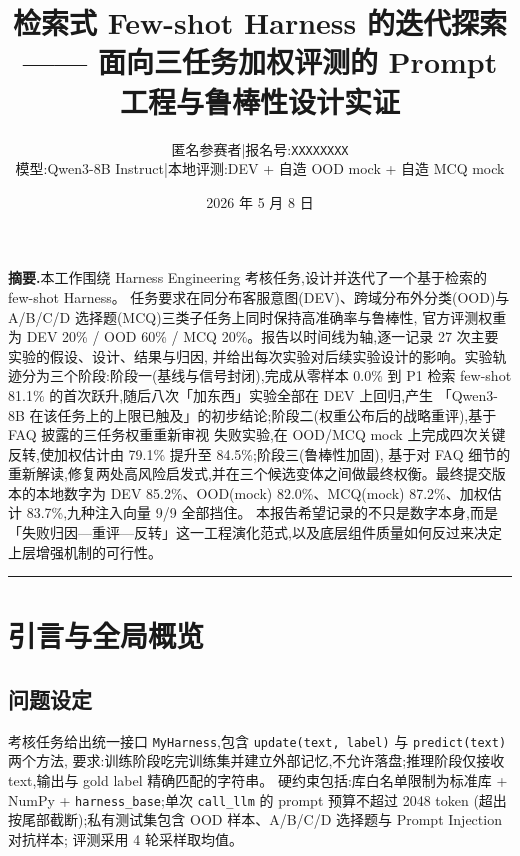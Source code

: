 \documentclass[11pt,a4paper]{ctexart}
\title{\vspace{-1.2cm}\textbf{检索式 Few-shot Harness 的迭代探索}\\[0.3em]
  \large{—— 面向三任务加权评测的 Prompt 工程与鲁棒性设计实证}}
\author{\normalsize 匿名参赛者\quad|\quad 报名号:\texttt{XXXXXXXX} \\[0.4em]
  \small 模型:Qwen3-8B Instruct\quad|\quad 本地评测:DEV + 自造 OOD mock + 自造 MCQ mock}
\date{\small 2026 年 5 月 8 日}
\begin{document}
\maketitle
\thispagestyle{fancy}

\begin{center}
\begin{minipage}{0.92\textwidth}
\textbf{摘要.}\;本工作围绕 Harness Engineering 考核任务,设计并迭代了一个基于检索的 few-shot Harness。
任务要求在同分布客服意图(DEV)、跨域分布外分类(OOD)与 A/B/C/D 选择题(MCQ)三类子任务上同时保持高准确率与鲁棒性,
官方评测权重为 DEV 20\% / OOD 60\% / MCQ 20\%。报告以时间线为轴,逐一记录 27 次主要实验的假设、设计、结果与归因,
并给出每次实验对后续实验设计的影响。实验轨迹分为三个阶段:阶段一(基线与信号封闭),完成从零样本
0.0\% 到 P1 检索 few-shot 81.1\% 的首次跃升,随后八次「加东西」实验全部在 DEV 上回归,产生
「Qwen3-8B 在该任务上的上限已触及」的初步结论;阶段二(权重公布后的战略重评),基于 FAQ 披露的三任务权重重新审视
失败实验,在 OOD/MCQ mock 上完成四次关键反转,使加权估计由 79.1\% 提升至 84.5\%;阶段三(鲁棒性加固),
基于对 FAQ 细节的重新解读,修复两处高风险启发式,并在三个候选变体之间做最终权衡。最终提交版本的本地数字为
DEV 85.2\%、OOD(mock) 82.0\%、MCQ(mock) 87.2\%、加权估计 83.7\%,九种注入向量 9/9 全部挡住。
本报告希望记录的不只是数字本身,而是「失败归因—重评—反转」这一工程演化范式,以及底层组件质量如何反过来决定上层增强机制的可行性。
\end{minipage}
\end{center}

\vspace{0.5em}
\hrule
\vspace{0.5em}

\section{引言与全局概览}

\subsection{问题设定}

考核任务给出统一接口 \texttt{MyHarness},包含 \texttt{update(text,\,label)} 与 \texttt{predict(text)} 两个方法,
要求:训练阶段吃完训练集并建立外部记忆,不允许落盘;推理阶段仅接收 text,输出与 gold label 精确匹配的字符串。
硬约束包括:库白名单限制为标准库 + NumPy + \texttt{harness\_base};单次 \texttt{call\_llm} 的 prompt 预算不超过 2048 token
(超出按尾部截断);私有测试集包含 OOD 样本、A/B/C/D 选择题与 Prompt Injection 对抗样本;
评测采用 4 轮采样取均值。
\end{document}
